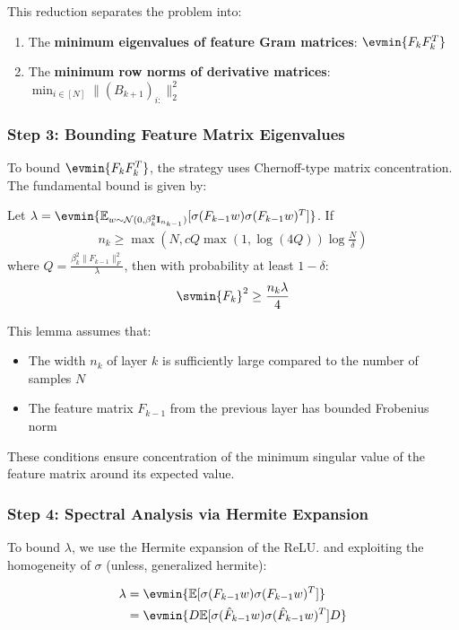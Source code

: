 \documentclass[a4paper]{article}
\newcommand{\E}{\mathbb{E}}
\begin{document}
This reduction separates the problem into:
\begin{enumerate}
    \item The \textbf{minimum eigenvalues of feature Gram matrices}: $\evmin{F_k F_k^T}$
    \item The \textbf{minimum row norms of derivative matrices}: $\min_{i \in [N]} \|(B_{k+1})_{i:}\|_2^2$
\end{enumerate}

\subsubsection{Step 3: Bounding Feature Matrix Eigenvalues}

To bound $\evmin{F_k F_k^T}$, the strategy uses Chernoff-type matrix concentration. The fundamental bound is given by:
\begin{lemma}
Let $\lambda = \evmin{\E_{w \sim \mathcal{N}(0, \beta_k^2 \mathbf{I}_{n_{k-1}})}[\sigma(F_{k-1}w)\sigma(F_{k-1}w)^T]}$. If 
\begin{align}
n_k \geq \max\left(N, c Q \max(1, \log(4Q)) \log\frac{N}{\delta}\right)
\end{align}
where $Q = \frac{\beta_k^2 \|F_{k-1}\|_F^2}{\lambda}$, then with probability at least $1-\delta$:
\begin{align}
\svmin{F_k}^2 \geq \frac{n_k \lambda}{4}
\end{align}

This lemma assumes that:
\begin{itemize}
\item The width $n_k$ of layer $k$ is sufficiently large compared to the number of samples $N$
\item The feature matrix $F_{k-1}$ from the previous layer has bounded Frobenius norm
\end{itemize}
These conditions ensure concentration of the minimum singular value of the feature matrix around its expected value.
\end{lemma}

\subsubsection{Step 4: Spectral Analysis via Hermite Expansion}

To bound $\lambda$, we use the Hermite expansion of the ReLU. and exploiting the homogeneity of $\sigma$ (unless, generalized hermite):

\begin{align}
\lambda &= \evmin{\E[\sigma(F_{k-1}w)\sigma(F_{k-1}w)^T]} \\
&= \evmin{D \E[\sigma(\hat{F}_{k-1}w)\sigma(\hat{F}_{k-1}w)^T] D}
\end{align}
\end{document}
